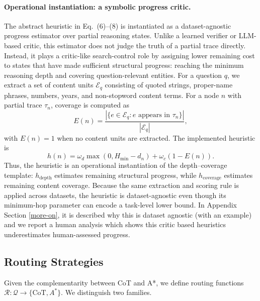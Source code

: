 \documentclass[10pt]{article}
\begin{document}
\paragraph{Operational instantiation: a symbolic progress critic.}
The abstract heuristic in Eq.~(6)--(8) is instantiated as a
dataset-agnostic progress estimator over partial reasoning states. Unlike
a learned verifier or LLM-based critic, this estimator does not judge the
truth of a partial trace directly. Instead, it plays a critic-like
search-control role by assigning lower remaining cost to states that have
made sufficient structural progress: reaching the minimum reasoning depth
and covering question-relevant entities. For a question \(q\), we extract
a set of content units \(\mathcal{E}_q\) consisting of quoted strings,
proper-name phrases, numbers, years, and non-stopword content terms. For
a node \(n\) with partial trace \(\tau_n\), coverage is computed as
\[
E(n)=
\frac{|\{e\in\mathcal{E}_q: e \text{ appears in } \tau_n\}|}
{|\mathcal{E}_q|},
\]
with \(E(n)=1\) when no content units are extracted. The implemented
heuristic is
\[
h(n)
=
\omega_d\max(0,H_{\min}-d_n)
+
\omega_c(1-E(n)).
\]
Thus, the heuristic is an operational instantiation of the
depth--coverage template: \(h_{\mathrm{depth}}\) estimates remaining
structural progress, while \(h_{\mathrm{coverage}}\) estimates remaining
content coverage. Because the same extraction and scoring rule is applied
across datasets, the heuristic is dataset-agnostic even though its
minimum-hop parameter can encode a task-level lower bound. In Appendix Section \ref{more-on}, it is described why this is dataset agnostic (with an example) and we report a human analysis which shows this critic based heuristics underestimates human-assessed progress.





\subsection{Routing Strategies}
\label{sec:routing}

Given the complementarity between CoT and A*, we define routing functions $\mathcal{R}: \mathcal{Q} \to \{\text{CoT}, A^*\}$. We distinguish two families.
\end{document}
